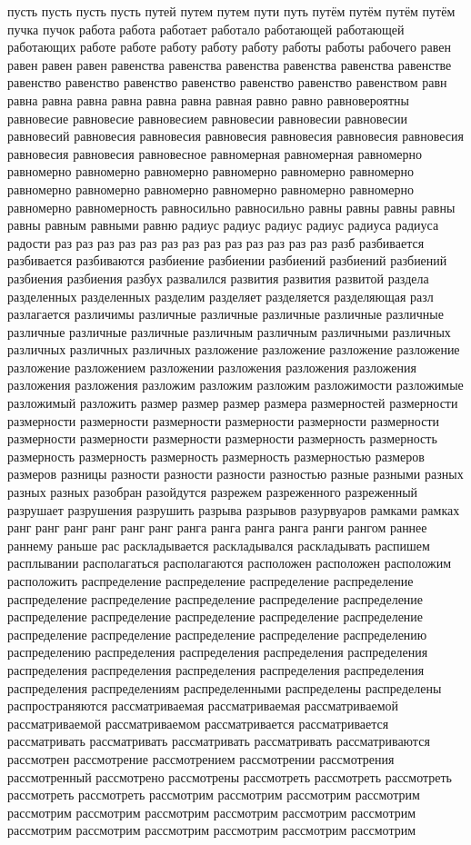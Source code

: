 пусть пусть пусть пусть путей путем путем пути путь путём путём путём путём пучка пучок работа работа работает работало работающей работающей работающих работе работе работу работу работу работы работы рабочего равен равен равен равен равенства равенства равенства равенства равенства равенстве равенство равенство равенство равенство равенство равенство равенством равн равна равна равна равна равна равна равная равно равно равновероятны равновесие равновесие равновесием равновесии равновесии равновесии равновесий равновесия равновесия равновесия равновесия равновесия равновесия равновесия равновесия равновесное равномерная равномерная равномерно равномерно равномерно равномерно равномерно равномерно равномерно равномерно равномерно равномерно равномерно равномерно равномерно равномерно равномерность равносильно равносильно равны равны равны равны равны равным равными равню радиус радиус радиус радиус радиуса радиуса радости раз раз раз раз раз раз раз раз раз раз раз раз раз разб разбивается разбивается разбиваются разбиение разбиении разбиений разбиений разбиений разбиения разбиения разбух развалился развития развития развитой раздела разделенных разделенных разделим разделяет разделяется разделяющая разл разлагается различимы различные различные различные различные различные различные различные различные различным различным различными различных различных различных различных разложение разложение разложение разложение разложение разложением разложении разложения разложения разложения разложения разложения разложим разложим разложим разложимости разложимые разложимый разложить размер размер размер размера размерностей размерности размерности размерности размерности размерности размерности размерности размерности размерности размерности размерности размерность размерность размерность размерность размерность размерность размерностью размеров размеров разницы разности разности разности разностью разные разными разных разных разных разобран разойдутся разрежем разреженного разреженный разрушает разрушения разрушить разрыва разрывов разурвуаров рамками рамках ранг ранг ранг ранг ранг ранг ранга ранга ранга ранга ранги рангом раннее раннему раньше рас раскладывается раскладывался раскладывать распишем расплывании располагаться располагаются расположен расположен расположим расположить распределение распределение распределение распределение распределение распределение распределение распределение распределение распределение распределение распределение распределение распределение распределение распределение распределение распределение распределению распределению распределения распределения распределения распределения распределения распределения распределения распределения распределения распределения распределениям распределенными распределены распределены распространяются рассматриваемая рассматриваемая рассматриваемой рассматриваемой рассматриваемом рассматривается рассматривается рассматривать рассматривать рассматривать рассматривать рассматриваются рассмотрен рассмотрение рассмотрением рассмотрении рассмотрения рассмотренный рассмотрено рассмотрены рассмотреть рассмотреть рассмотреть рассмотреть рассмотреть рассмотрим рассмотрим рассмотрим рассмотрим рассмотрим рассмотрим рассмотрим рассмотрим рассмотрим рассмотрим рассмотрим рассмотрим рассмотрим рассмотрим рассмотрим рассмотрим 